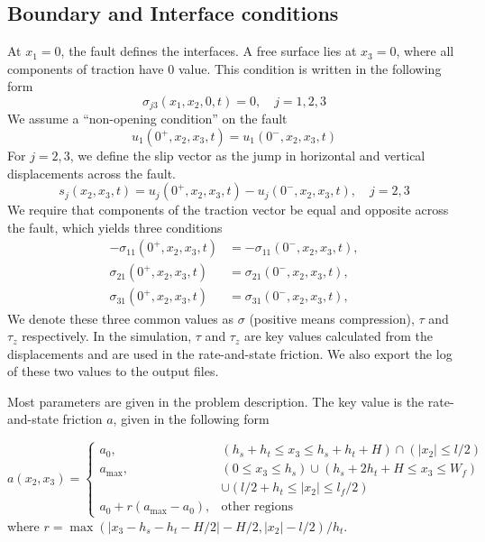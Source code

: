 \subsection{Boundary and Interface conditions}
At $x_1 = 0$, the fault defines the interfaces.
A free surface lies at $x_3 = 0$, where all components of traction have $0$ value.
This condition is written in the following form
\begin{equation}
    \sigma_{j3}(x_1, x_2, 0, t) = 0,\quad j = 1,2,3
\end{equation}
We assume a ``non-opening condition'' on the fault
\begin{equation}
    u_1(0^+, x_2, x_3, t) = u_1(0^-, x_2, x_3, t)
\end{equation}
For $j=2,3$, we define the slip vector as the jump in horizontal and vertical displacements across the fault.
\begin{equation}
    s_j(x_2, x_3, t) = u_j(0^+, x_2, x_3, t) - u_j(0^-, x_2, x_3, t),\quad j = 2,3
\end{equation}
We require that components of the traction vector be equal and opposite across the fault, which yields three conditions
\begin{align}
    -\sigma_{11} \left(0^+, x_2, x_3, t\right) &= -\sigma_{11} \left(0^-, x_2, x_3, t\right), \\
    \sigma_{21} \left(0^+, x_2, x_3, t\right) &= \sigma_{21} \left(0^-, x_2, x_3, t\right), \\
    \sigma_{31} \left(0^+, x_2, x_3, t\right) &= \sigma_{31} \left(0^-, x_2, x_3, t\right),
\end{align}
We denote these three common values as $\sigma$ (positive means compression), $\tau$ and $\tau_z$ respectively. 
In the simulation, $\tau$ and $\tau_z$ are key values calculated from the displacements and are used in the rate-and-state friction.
We also export the log of these two values to the output files.

Most parameters are given in the problem description. The key value is the rate-and-state friction $a$, given in the following form

\begin{equation}
    a(x_2, x_3) =
\begin{cases} 
a_0, & (h_s + h_t \leq x_3 \leq h_s + h_t + H) \cap (|x_2| \leq l/2) \\
a_{\text{max}}, & (0 \leq x_3 \leq h_s) \cup (h_s + 2h_t + H \leq x_3 \leq W_f) \\ & \cup (l/2 + h_t \leq |x_2| \leq l_f/2) \\
a_0 + r(a_{\text{max}} - a_0), & \text{other regions}
\end{cases}
\end{equation}
where $r = \max(|x_3 - h_s - h_t - H/2| - H/2, |x_2| - l/2)/h_t$.



